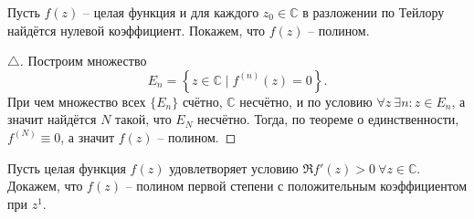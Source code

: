 
Пусть $f(z)$  -- целая функция и для каждого $z_0 \in \mathbb{C}$ в разложении по Тейлору найдётся нулевой коэффициент. Покажем, что $f(z)$ -- полином. 

\begin{proof}[$\triangle$]

Построим множество
\begin{equation*}
    E_n = \left\{
        z \in \mathbb{C} \mid f^{(n)} (z) = 0
    \right\}.
\end{equation*}
При чем множество всех $\{E_n\}$ счётно, $\mathbb{C}$ несчётно, 
и по условию $\forall  z \ \exists n \colon  z \in E_n$, 
 а значит найдётся $N$ такой, что $E_N$ несчётно. Тогда, по теореме о единственности, $f^{(N)} \equiv 0$, а значит $f(z)$ -- полином. 


\end{proof}



Пусть целая функция $f(z)$ удовлетворяет условию $\Re f' (z) > 0 \ \forall  z \in \mathbb{C}$. Докажем, что $f(z)$ -- полином первой степени с положительным коэффициентом при $z^1$. 

